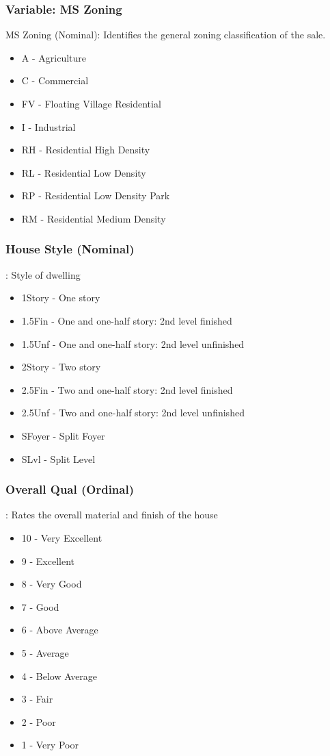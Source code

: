 \documentclass[sigconf]{acmart}
\begin{document}
	\subsubsection{Variable: MS Zoning}
	MS Zoning (Nominal): Identifies the general zoning classification of the sale.
	\begin{itemize}
		\item A - Agriculture
		\item C - Commercial
		\item FV - Floating Village Residential
		\item I - Industrial
		\item RH - Residential High Density
		\item RL - Residential Low Density
		\item RP - Residential Low Density Park
		\item RM - Residential Medium Density
	\end{itemize}
	
	\subsubsection{House Style (Nominal)}: Style of dwelling
	\begin{itemize}
		\item  1Story - One story
		\item  1.5Fin - One and one-half story: 2nd level finished
		\item  1.5Unf - One and one-half story: 2nd level unfinished
		\item  2Story - Two story
		\item  2.5Fin - Two and one-half story: 2nd level finished
		\item  2.5Unf - Two and one-half story: 2nd level unfinished
		\item  SFoyer - Split Foyer
		\item  SLvl - Split Level
	\end{itemize}
	
	\subsubsection{Overall Qual (Ordinal)}: Rates the overall material and finish of the house
	\begin{itemize}
		\item  10 - Very Excellent
		\item  9 -  Excellent
		\item  8 -  Very Good
		\item  7 -  Good
		\item  6 -  Above Average
		\item  5 -  Average
		\item  4 -  Below Average
		\item  3 -  Fair
		\item  2 -  Poor
		\item  1 -  Very Poor
	\end{itemize}
	
\end{document}
